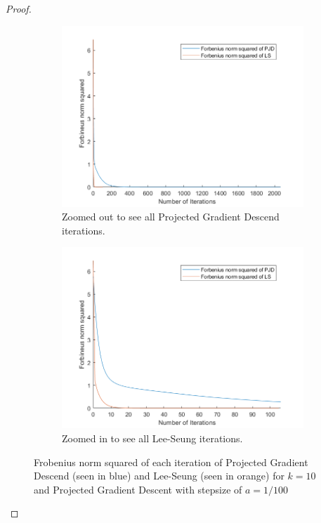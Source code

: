 \documentclass[12pt]{report}
\begin{document}
\begin{problem}
\begin{proof}
\begin{figure}[H]
    \begin{subfigure}[b]{0.5\linewidth}
        \centering
        \includegraphics[width=\linewidth]{images/k10l.png}
        \caption{Zoomed out to see all Projected Gradient Descend iterations.}
        \label{fig4:a}
        \vspace{4ex}
    \end{subfigure}%
    \begin{subfigure}[b]{0.5\linewidth}
        \centering
        \includegraphics[width=\linewidth]{images/k10s.png}
        \caption{Zoomed in to see all Lee-Seung iterations.}
        \label{fig4:b}
        \vspace{4ex}
    \end{subfigure}
    \caption{Frobenius norm squared of each iteration of Projected Gradient Descend (seen in blue) and Lee-Seung (seen in orange) for $k=10$ and Projected Gradient Descent with stepsize of $a=1/100$}
    \label{fig4}
\end{figure}
\end{proof}
\end{problem}
\end{document}
